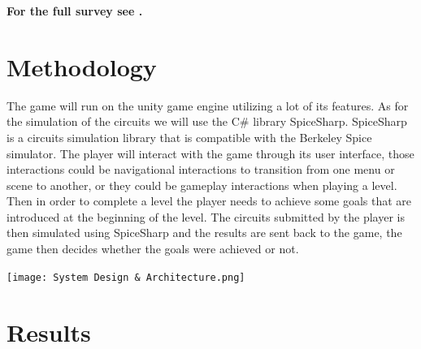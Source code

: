 \documentclass[twoside,a4paper,11pt]{article}
\begin{document}
\begin{multicols}{2}
\textbf{For the full survey see \cite{28}.}

\section{Methodology}

The game will run on the unity game engine utilizing a lot of its features. As for the simulation of the circuits we will use the C\# library SpiceSharp. SpiceSharp is a circuits simulation library that is compatible with the Berkeley Spice simulator. The player will interact with the game through its user interface, those interactions could be navigational interactions to transition from one menu or scene to another, or they could be gameplay interactions when playing a level. Then in order to complete a level the player needs to achieve some goals that are introduced at the beginning of the level. The circuits submitted by the player is then simulated using SpiceSharp and the results are sent back to the game, the game then decides whether the goals were achieved or not.

\begin{center}
    \texttt{[image: System Design \& Architecture.png]}
\end{center}
    
\section{Results} 

\end{multicols}
\end{document}
